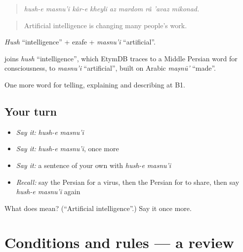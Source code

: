 \begin{quote}
\emph{hush-e masnu'i kâr-e kheyli az mardom râ 'avaz mikonad.}
\end{quote}

\begin{quote}
Artificial intelligence is changing many people's work.
\end{quote}

\emph{Hush} \textquotedblleft{}intelligence\textquotedblright{} + ezafe + \emph{masnu'i} \textquotedblleft{}artificial\textquotedblright{}.

\begin{cousinweb}
\textbf{ } joins \emph{hush} \textquotedblleft{}intelligence\textquotedblright{}, which EtymDB traces to a Middle Persian word for consciousness, to \emph{masnu'i} \textquotedblleft{}artificial\textquotedblright{}, built on Arabic \emph{maṣnū'} \textquotedblleft{}made\textquotedblright{}.
\end{cousinweb}

\begin{grammarlens}[title={What you've built}]
One more word for telling, explaining and describing at B1.
\end{grammarlens}

\subsection*{Your turn}
\begin{itemize}
\raggedright
  \item \emph{Say it:} \emph{hush-e masnu'i}
  \item \emph{Say it:} \emph{hush-e masnu'i}, once more
  \item \emph{Say it:} a sentence of your own with \emph{hush-e masnu'i}
  \item \emph{Recall:} say the Persian for a virus, then the Persian for to share, then say \emph{hush-e masnu'i} again
\end{itemize}

\begin{tcolorbox}[breakable,colback=teal!4,colframe=teal!35!black,title={Before you move on}]
What does   mean? (\textquotedblleft{}Artificial intelligence\textquotedblright{}.) Say it once more.
\end{tcolorbox}
\section[(dialogue)]{Conditions and rules — a review}

